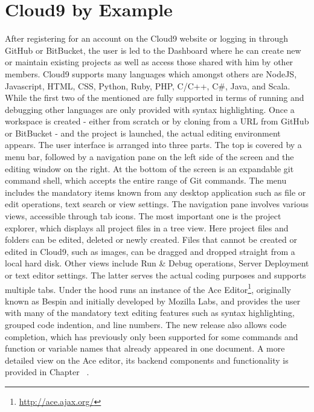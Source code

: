 \section{Cloud9 by Example}
\label{sec:Motivation}


After registering for an account on the Cloud9 website or logging in through GitHub or BitBucket,
the user is led to the Dashboard where he can create new or maintain existing projects as well as access those
shared with him by other members.
Cloud9 supports many languages which amongst others are NodeJS, Javascript, HTML, CSS, Python, Ruby, PHP, C/C++, C\#, Java, and Scala.
While the first two of the mentioned are fully supported in terms of running and debugging other languages are only provided with syntax highlighting.
Once a workspace is created - either from scratch or by cloning from a URL from GitHub or BitBucket -
and the project is launched, the actual editing environment appears.
The user interface is arranged into three parts. The top is covered by a menu bar, followed by a navigation pane
on the left side of the screen and the editing window on the right.
At the bottom of the screen is an expandable git command shell, which accepts the entire range of Git commands.
The menu includes the mandatory items known from any desktop application such as file or edit operations, text search or view settings.
The navigation pane involves various views, accessible through tab icons. The most important one is the project explorer,
which displays all project files in a tree view. Here project files and folders can be edited, deleted or newly created.
Files that cannot be created or edited in Cloud9, such as images, can be dragged and dropped straight from a local hard disk.
Other views include Run \& Debug operations, Server Deployment or text editor settings.
The latter serves the actual coding purposes and supports multiple tabs. Under the hood runs an instance of the Ace
Editor\footnote{\url{http://ace.ajax.org/}}, originally known as Bespin and initially developed by Mozilla Labs,
and provides the user with many of the mandatory text editing features such as syntax highlighting, grouped code indention, and line numbers.
The new release also allows code completion, which has previously only been supported for some commands and
function or variable names that already appeared in one document.
A more detailed view on the Ace editor, its backend components and functionality is provided in Chapter ~\needcite. 

